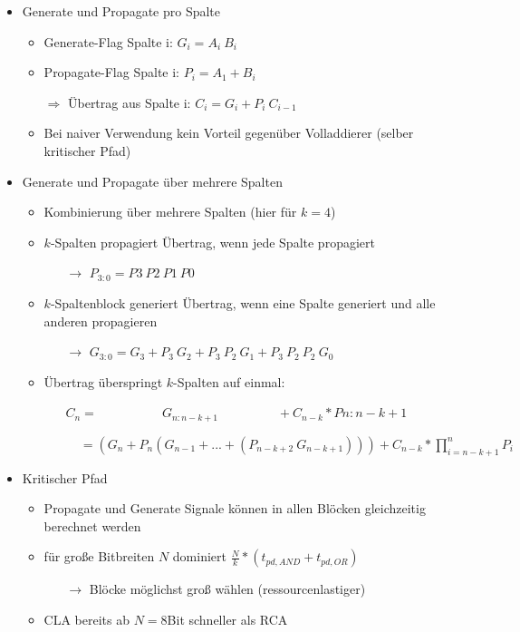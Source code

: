 \documentclass[11pt,a4paper]{article}
\begin{document}
\begin{itemize}
\begin{itemize}
	\item Generate und Propagate pro Spalte
		\begin{itemize}
		\item Generate-Flag Spalte i:						$G_i = A_i~B_i$
		\item Propagate-Flag Spalte i:						$P_i = A_1+B_i$
		\item[$\Rightarrow$] Übertrag aus Spalte i:		$C_i = G_i + P_i~C_{i-1}$
		\item Bei naiver Verwendung kein Vorteil gegenüber Volladdierer (selber kritischer Pfad)
		\end{itemize}			
	
	\item Generate und Propagate über mehrere Spalten
		\begin{itemize}
		\item Kombinierung über mehrere Spalten (hier für $k=4$)
		\item $k$-Spalten propagiert Übertrag, wenn jede Spalte propagiert
			\begin{itemize}
			\item[$\rightarrow$] $P_{3:0}=P3~P2~P1~P0$
			\end{itemize}
		\item $k$-Spaltenblock generiert Übertrag, wenn eine Spalte generiert und alle anderen propagieren
			\begin{itemize}
			\item[$\rightarrow$] $G_{3:0} = G_3 + P_3~G_2 + P_3~P_2~G_1+P_3~P_2~P_2~G_0$
			\end{itemize}
		\item Übertrag überspringt $k$-Spalten auf einmal:
			\begin{itemize}
			\item[] $C_n = ~~~~~~~~~~~~~~~~~~~~~~~G_{n:n-k+1}~~~~~~~~~~~~~~~~~~~~~ + C_{n-k} * P{n:n-k+1}$
			\item[] $~~~~~ = (G_n + P_n (G_{n-1} +...+ (P_{n-k+2}~G_{n-k+1}))) + C_{n-k} * \prod^n_{i=n-k+1}P_i$
			\end{itemize}
		\end{itemize}
	\item Kritischer Pfad
		\begin{itemize}
		\item Propagate und Generate Signale können in allen Blöcken gleichzeitig berechnet werden
		\item für große Bitbreiten $N$ dominiert $\frac{N}{k} * (t_{pd,AND} + t_{pd,OR})$
			\begin{itemize}
			\item[$\rightarrow$] Blöcke möglichst groß wählen (ressourcenlastiger)
			\end{itemize}
		\item CLA bereits ab $N = 8$Bit schneller als RCA
		\end{itemize}
	\end{itemize}
	

\end{itemize}
\end{document}
